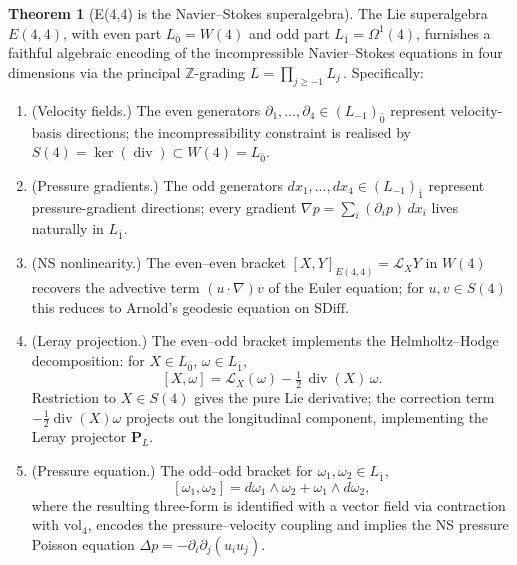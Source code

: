 \documentclass[reqno,10pt]{amsart}
\theoremstyle{definition}
\newtheorem{theor}[subsubsection]{Theorem}
\def\Wn{W(4)}
\def\Sn{S(4)}
\def\divX{{\operatorname{div}}}
\begin{document}
\begin{theor}[E(4,4) is the Navier--Stokes superalgebra]\label{thm:ns-e44}
The Lie superalgebra $E(4,4)$, with even part $L_{\bar 0} = \Wn$ and odd part
$L_{\bar 1} = \Omega^1(4)$, furnishes a faithful algebraic encoding of the
incompressible Navier--Stokes equations in four dimensions via the principal
$\mathbb{Z}$-grading $L = \prod_{j\geq -1}L_j$\,.  Specifically:
\begin{enumerate}
\item[(i)] \textup{(Velocity fields.)}
The even generators $\partial_1,\ldots,\partial_4\in(L_{-1})_{\bar 0}$ represent
velocity-basis directions; the incompressibility constraint is realised by
$\Sn = \ker(\divX)\subset\Wn = L_{\bar 0}$.

\item[(ii)] \textup{(Pressure gradients.)}
The odd generators $dx_1,\ldots,dx_4\in(L_{-1})_{\bar 1}$ represent
pressure-gradient directions; every gradient $\nabla p = \sum_i(\partial_i p)\,dx_i$
lives naturally in $L_{\bar 1}$.

\item[(iii)] \textup{(NS nonlinearity.)}
The even--even bracket $[X,Y]_{E(4,4)} = \mathcal{L}_X Y$ in $\Wn$ recovers the
advective term $(u\cdot\nabla)v$ of the Euler equation; for $u,v\in\Sn$ this
reduces to Arnold's geodesic equation on $\mathrm{SDiff}$.

\item[(iv)] \textup{(Leray projection.)}
The even--odd bracket implements the Helmholtz--Hodge decomposition:
for $X\in L_{\bar 0}$, $\omega\in L_{\bar 1}$,
\begin{equation}\label{eq:mixed-bracket}
  [X,\omega] = \mathcal{L}_X(\omega) - \tfrac{1}{2}\,\divX(X)\,\omega.
\end{equation}
Restriction to $X\in\Sn$ gives the pure Lie derivative; the correction term
$-\tfrac{1}{2}\divX(X)\omega$ projects out the longitudinal component,
implementing the Leray projector $\mathbf{P}_L$.

\item[(v)] \textup{(Pressure equation.)}
The odd--odd bracket for $\omega_1,\omega_2\in L_{\bar 1}$,
\begin{equation}\label{eq:odd-bracket}
  [\omega_1,\omega_2] = d\omega_1\wedge\omega_2 + \omega_1\wedge d\omega_2,
\end{equation}
where the resulting three-form is identified with a vector field via contraction
with $\mathrm{vol}_4$, encodes the pressure--velocity coupling and implies
the NS pressure Poisson equation $\Delta p = -\partial_i\partial_j(u_i u_j)$.


\end{enumerate}
\end{theor}
\end{document}
